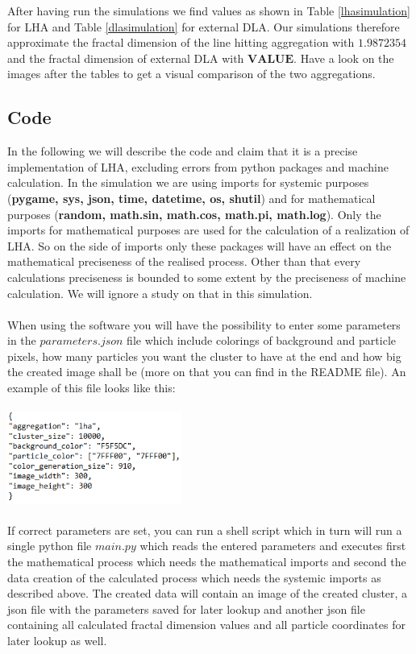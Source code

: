 \documentclass[12pt,a4paper]{scrartcl}
\numberwithin{equation}{subsection}
\newcommand{\1}{\mathbbm{1}}
\numberwithin{equation}{section}
\theoremstyle{definition}
\begin{document}
After having run the simulations we find values as shown in Table \ref{lhasimulation} for LHA and Table \ref{dlasimulation} for external DLA. Our simulations therefore approximate the fractal dimension of the line hitting aggregation with $\mathbf{1.9872354}$ and the fractal dimension of external DLA with $\mathbf{VALUE}$. Have a look on the images after the tables to get a visual comparison of the two aggregations. 





\subsection{Code}
In the following we will describe the code and claim that it is a precise implementation of LHA, excluding errors from python packages and machine calculation. In the simulation we are using imports for systemic purposes (\textbf{pygame, sys, json, time, datetime, os, shutil}) and for mathematical purposes (\textbf{random, math.sin, math.cos, math.pi, math.log}). Only the imports for mathematical purposes are used for the calculation of a realization of LHA. So on the side of imports only these packages will have an effect on the mathematical preciseness of the realised process. Other than that every calculations preciseness is bounded to some extent by the preciseness of machine calculation. We will ignore a study on that in this simulation. \\
\\When using the software you will have the possibility to enter some parameters in the $\mathit{parameters.json}$ file which include colorings of background and particle pixels, how many particles you want the cluster to have at the end and how big the created image shall be (more on that you can find in the README file). An example of this file looks like this:\\
\\
\includegraphics[height=3cm]{images/code-snippets/parameters.png} \\
\\
If correct parameters are set, you can run a shell script which in turn will run a single python file $\mathit{main.py}$ which reads the entered parameters and executes first the mathematical process which needs the mathematical imports and second the data creation of the calculated process which needs the systemic imports as described above. The created data will contain an image of the created cluster, a json file with the parameters saved for later lookup and another json file containing all calculated fractal dimension values and all particle coordinates for later lookup as well. \\
\end{document}
